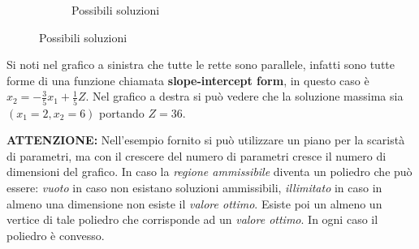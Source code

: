 \documentclass{article}
\begin{document}
\begin{figure}[ht]
\begin{subfigure}[b]{0.50\textwidth}
          \caption{Possibili soluzioni}
        \end{subfigure}

      \end{figure}

      Si noti nel grafico a sinistra che tutte le rette sono parallele, infatti sono tutte forme di una funzione chiamata \textbf{slope-intercept form}, in questo caso è $x_2=-\frac{3}{5}x_1+\frac{1}{5}Z$. Nel grafico a destra si può vedere che la soluzione massima sia $(x_1=2,x_2=6)$ portando $Z=36$.
  
    \begin{tcolorbox}
      \textbf{ATTENZIONE:}
        Nell'esempio fornito si può utilizzare un piano per la scaristà di parametri, ma con il crescere del numero di parametri cresce il numero di dimensioni del grafico. In caso la \textit{regione ammissibile} diventa un poliedro che può essere: \textit{vuoto} in caso non esistano soluzioni ammissibili, \textit{illimitato} in caso in almeno una dimensione non esiste il \textit{valore ottimo}. Esiste poi un almeno un vertice di tale poliedro che corrisponde ad un \textit{valore ottimo}. In ogni caso il poliedro è convesso.
      
    \end{tcolorbox}
\end{document}
